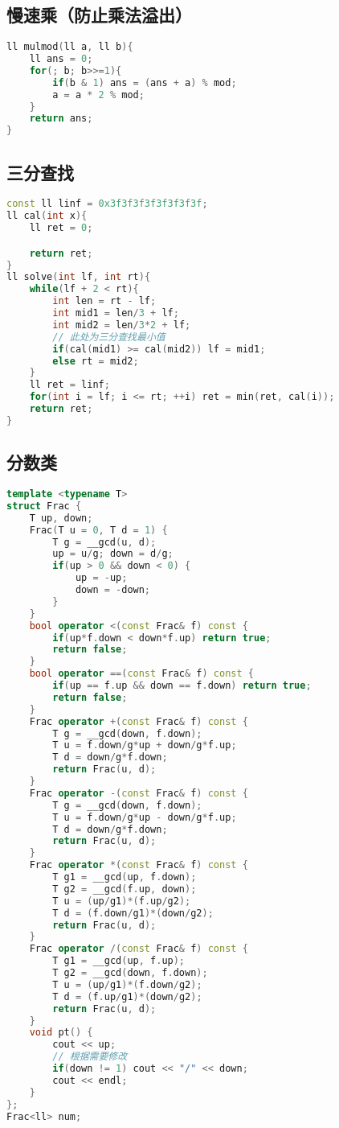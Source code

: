 \subsection{慢速乘（防止乘法溢出）}

\begin{lstlisting}[language=C++]
ll mulmod(ll a, ll b){
    ll ans = 0;
    for(; b; b>>=1){
        if(b & 1) ans = (ans + a) % mod;
        a = a * 2 % mod;
    }
    return ans;
}
\end{lstlisting}

\subsection{三分查找}

\begin{lstlisting}[language=C++]
const ll linf = 0x3f3f3f3f3f3f3f3f;
ll cal(int x){
    ll ret = 0;

    return ret;
}
ll solve(int lf, int rt){
    while(lf + 2 < rt){
        int len = rt - lf;
        int mid1 = len/3 + lf;
        int mid2 = len/3*2 + lf;
        // 此处为三分查找最小值
        if(cal(mid1) >= cal(mid2)) lf = mid1;
        else rt = mid2;
    }
    ll ret = linf;
    for(int i = lf; i <= rt; ++i) ret = min(ret, cal(i));
    return ret;
}
\end{lstlisting}

\subsection{分数类}

\begin{lstlisting}[language=C++]
template <typename T>
struct Frac {
    T up, down;
    Frac(T u = 0, T d = 1) {
        T g = __gcd(u, d);
        up = u/g; down = d/g;
        if(up > 0 && down < 0) {
            up = -up;
            down = -down;
        }
    }
    bool operator <(const Frac& f) const {
        if(up*f.down < down*f.up) return true;
        return false;
    }
    bool operator ==(const Frac& f) const {
        if(up == f.up && down == f.down) return true;
        return false;
    }
    Frac operator +(const Frac& f) const {
        T g = __gcd(down, f.down);
        T u = f.down/g*up + down/g*f.up;
        T d = down/g*f.down;
        return Frac(u, d);
    }
    Frac operator -(const Frac& f) const {
        T g = __gcd(down, f.down);
        T u = f.down/g*up - down/g*f.up;
        T d = down/g*f.down;
        return Frac(u, d);
    }
    Frac operator *(const Frac& f) const {
        T g1 = __gcd(up, f.down);
        T g2 = __gcd(f.up, down);
        T u = (up/g1)*(f.up/g2);
        T d = (f.down/g1)*(down/g2);
        return Frac(u, d);
    }
    Frac operator /(const Frac& f) const {
        T g1 = __gcd(up, f.up);
        T g2 = __gcd(down, f.down);
        T u = (up/g1)*(f.down/g2);
        T d = (f.up/g1)*(down/g2);
        return Frac(u, d);
    }
    void pt() {
        cout << up;
        // 根据需要修改
        if(down != 1) cout << "/" << down;
        cout << endl;
    }
};
Frac<ll> num;
\end{lstlisting}

